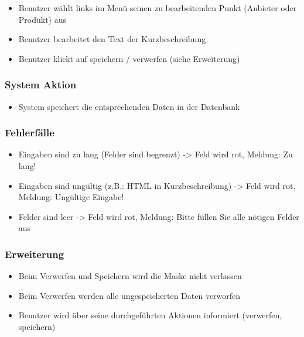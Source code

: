 \documentclass[a4paper,12pt]{article}
\begin{document}
\begin{itemize}
\item
  Benutzer wählt links im Menü seinen zu bearbeitenden Punkt (Anbieter
  oder Produkt) aus
\item
  Benutzer bearbeitet den Text der Kurzbeschreibung
\item
  Benutzer klickt auf speichern / verwerfen (siehe Erweiterung)
\end{itemize}

\subsubsection{System Aktion}\label{system-aktion-2}

\begin{itemize}
\item
  System speichert die entsprechenden Daten in der Datenbank
\end{itemize}

\subsubsection{Fehlerfälle}\label{fehlerfalle-2}

\begin{itemize}
\item
  Eingaben sind zu lang (Felder sind begrenzt) -\textgreater{} Feld wird
  rot, Meldung: Zu lang!
\item
  Eingaben sind ungültig (z.B.: HTML in Kurzbeschreibung)
  -\textgreater{} Feld wird rot, Meldung: Ungültige Eingabe!
\item
  Felder sind leer -\textgreater{} Feld wird rot, Meldung: Bitte füllen
  Sie alle nötigen Felder aus
\end{itemize}

\subsubsection{Erweiterung}\label{erweiterung-2}

\begin{itemize}

\item
  Beim Verwerfen und Speichern wird die Maske nicht verlassen
\item
  Beim Verwerfen werden alle ungespeicherten Daten verworfen
\item
  Benutzer wird über seine durchgeführten Aktionen informiert
  (verwerfen, speichern)
\end{itemize}
\end{document}
